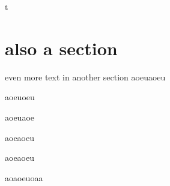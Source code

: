 t\section{also a section}
even more text in another section
aoeuaoeu

aoeuoeu \cite{Hansen_2015}

aoeuaoe \cite{Hansen_2011}

aoeaoeu

aoeaoeu

aoaoeuoaa
